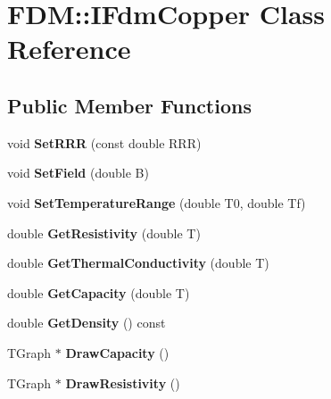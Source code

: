\hypertarget{class_f_d_m_1_1_i_fdm_copper}{}\section{F\+D\+M\+:\+:I\+Fdm\+Copper Class Reference}
\label{class_f_d_m_1_1_i_fdm_copper}
\subsection*{Public Member Functions}
\begin{DoxyCompactItemize}
\item 
\hypertarget{class_f_d_m_1_1_i_fdm_copper_a034ab099818101b77e99666ee3216881}{}void {\bfseries Set\+R\+R\+R} (const double R\+R\+R)\label{class_f_d_m_1_1_i_fdm_copper_a034ab099818101b77e99666ee3216881}

\item 
\hypertarget{class_f_d_m_1_1_i_fdm_copper_ad71c5355fffef3acfc769a94f1744ee1}{}void {\bfseries Set\+Field} (double B)\label{class_f_d_m_1_1_i_fdm_copper_ad71c5355fffef3acfc769a94f1744ee1}

\item 
\hypertarget{class_f_d_m_1_1_i_fdm_copper_ab1ad77254f484d437842aeb990ce1430}{}void {\bfseries Set\+Temperature\+Range} (double T0, double Tf)\label{class_f_d_m_1_1_i_fdm_copper_ab1ad77254f484d437842aeb990ce1430}

\item 
\hypertarget{class_f_d_m_1_1_i_fdm_copper_ae6c66f60401ab2afce7de14c571db7dd}{}double {\bfseries Get\+Resistivity} (double T)\label{class_f_d_m_1_1_i_fdm_copper_ae6c66f60401ab2afce7de14c571db7dd}

\item 
\hypertarget{class_f_d_m_1_1_i_fdm_copper_a1a65b4aac5750789d9ae2ae332164081}{}double {\bfseries Get\+Thermal\+Conductivity} (double T)\label{class_f_d_m_1_1_i_fdm_copper_a1a65b4aac5750789d9ae2ae332164081}

\item 
\hypertarget{class_f_d_m_1_1_i_fdm_copper_a9f8fa95c17fc544c4f2a8d378c22efcd}{}double {\bfseries Get\+Capacity} (double T)\label{class_f_d_m_1_1_i_fdm_copper_a9f8fa95c17fc544c4f2a8d378c22efcd}

\item 
\hypertarget{class_f_d_m_1_1_i_fdm_copper_a58f7475375b07bc561ee5e4ad6e69704}{}double {\bfseries Get\+Density} () const \label{class_f_d_m_1_1_i_fdm_copper_a58f7475375b07bc561ee5e4ad6e69704}

\item 
\hypertarget{class_f_d_m_1_1_i_fdm_copper_a711135f325423fc2e5dcea727f6d2f8a}{}T\+Graph $\ast$ {\bfseries Draw\+Capacity} ()\label{class_f_d_m_1_1_i_fdm_copper_a711135f325423fc2e5dcea727f6d2f8a}

\item 
\hypertarget{class_f_d_m_1_1_i_fdm_copper_a5752dfa5c43b629d13428e5da4379384}{}T\+Graph $\ast$ {\bfseries Draw\+Resistivity} ()\label{class_f_d_m_1_1_i_fdm_copper_a5752dfa5c43b629d13428e5da4379384}

\end{DoxyCompactItemize}
